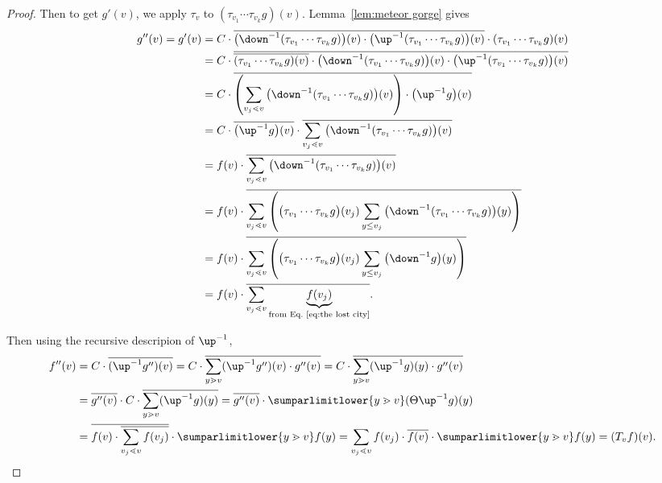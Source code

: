 \begin{proof}
Then to get $g'(v)$, we apply $\tau_v$ to $\left( \tau_{v_1} \cdots \tau_{v_k}g \right)(v)$. Lemma~\ref{lem:meteor gorge} gives
\begin{align*}
g''(v)=g'(v)&=
C\cdot \overline{\big(\down^{-1}( \tau_{v_1} \cdots \tau_{v_k}g)\big)(v)\cdot\big(\up^{-1}( \tau_{v_1} \cdots \tau_{v_k}g)\big)(v)}\cdot ( \tau_{v_1} \cdots \tau_{v_k}g)(v)
\\
&= C\cdot
\overline{\overline{( \tau_{v_1} \cdots \tau_{v_k}g)(v)}\cdot\big(\down^{-1}( \tau_{v_1} \cdots \tau_{v_k}g)\big)(v)\cdot\big(\up^{-1}( \tau_{v_1} \cdots \tau_{v_k}g)\big)(v)}
\\
&= C\cdot
\overline{\left(\sum\limits_{v_j\lessdot v}\big(\down^{-1}( \tau_{v_1} \cdots \tau_{v_k}g)\big)(v)\right)\cdot\big(\up^{-1}g\big)(v)}
\\
&=C\cdot \overline{\big(\up^{-1}g\big)(v)}\cdot
\overline{\sum\limits_{v_j\lessdot v}\big(\down^{-1}( \tau_{v_1} \cdots \tau_{v_k}g)\big)(v)}
\\
&=
f(v)\cdot
\overline{\sum\limits_{v_j\lessdot v}\big(\down^{-1}( \tau_{v_1} \cdots \tau_{v_k}g)\big)(v)}
\\
&=
f(v)\cdot
\overline{\sum\limits_{v_j\lessdot v}\left(\big(\tau_{v_1} \cdots \tau_{v_k}g\big)(v_j)
\sum\limits_{y\leq v_j}\big(\down^{-1}( \tau_{v_1} \cdots \tau_{v_k}g)\big)(y)\right)}
\\
&=
f(v)\cdot
\overline{\sum\limits_{v_j\lessdot v}\left(\big(\tau_{v_1} \cdots \tau_{v_k}g\big)(v_j)
\sum\limits_{y\leq v_j}\big(\down^{-1}g\big)(y)\right)}
\\
&=
f(v)\cdot
\overline{\sum\limits_{v_j\lessdot v}\underbrace{f(v_j)}_
\text{from Eq.~\eqref{eq:the lost city}}}.
\end{align*}

Then using the recursive descripion of $\up^{-1}$,
\begin{align*}
f''(v) &= C\cdot \overline{(\up^{-1}g'')(v)}
=
C\cdot \overline{\sum\limits_{y\gtrdot v}(\up^{-1}g'')(v)\cdot g''(v)}
=
C\cdot \overline{\sum\limits_{y\gtrdot v}(\up^{-1}g)(y)\cdot g''(v)}\\
&=
\overline{g''(v)}\cdot C\cdot \overline{\sum\limits_{y\gtrdot v}(\up^{-1}g)(y)}
=
\overline{g''(v)}\cdot \sumparlimitlower{y\gtrdot v}(\Theta\up^{-1}g)(y)
\\
&=
\overline{f(v)\cdot
\overline{\sum\limits_{v_j\lessdot v}f(v_j)}}\cdot \sumparlimitlower{y\gtrdot v}f(y)
=\sum\limits_{v_j\lessdot v}f(v_j) \cdot\overline{f(v)}\cdot
\sumparlimitlower{y\gtrdot v}f(y)
=
(T_v f)(v).
\end{align*}



\end{proof}
